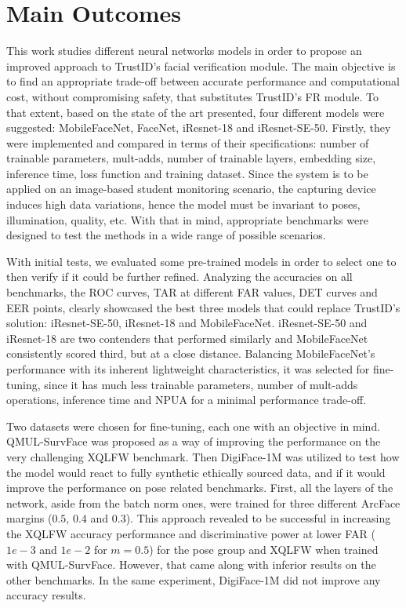 \documentclass[class=report, crop=false, a4paper, 12pt]{standalone}
\begin{document}
\section{Main Outcomes}
\par This work studies different neural networks models in order to propose an improved approach to TrustID's facial verification module. The main objective is to find an appropriate trade-off between accurate performance and computational cost, without compromising safety, that substitutes TrustID's FR module. To that extent, based on the state of the art presented, four different models were suggested: MobileFaceNet, FaceNet, iResnet-18 and iResnet-SE-50. Firstly, they were implemented and compared in terms of their specifications: number of trainable parameters, mult-adds, number of trainable layers, embedding size, inference time, loss function and training dataset. Since the system is to be applied on an image-based student monitoring scenario, the capturing device induces high data variations, hence the model must be invariant to poses, illumination, quality, etc. With that in mind, appropriate benchmarks were designed to test the methods in a wide range of possible scenarios.

\par With initial tests, we evaluated some pre-trained models in order to select one to then verify if it could be further refined. Analyzing the accuracies on all benchmarks, the ROC curves, TAR at different FAR values, DET curves and EER points, clearly showcased the best three models that could replace TrustID's solution: iResnet-SE-50, iResnet-18 and MobileFaceNet. iResnet-SE-50 and iResnet-18 are two contenders that performed similarly and MobileFaceNet consistently scored third, but at a close distance. Balancing MobileFaceNet's performance with its inherent lightweight characteristics, it was selected for fine-tuning, since it has much less trainable parameters, number of mult-adds operations, inference time and NPUA for a minimal performance trade-off.

\par Two datasets were chosen for fine-tuning, each one with an objective in mind. QMUL-SurvFace was proposed as a way of improving the performance on the very challenging XQLFW benchmark. Then DigiFace-1M was utilized to test how the model would react to fully synthetic ethically sourced data, and if it would improve the performance on pose related benchmarks. First, all the layers of the network, aside from the batch norm ones, were trained for three different ArcFace margins ($0.5$, $0.4$ and $0.3$). This approach revealed to be successful in increasing the XQLFW accuracy performance and discriminative power at lower FAR ($1e-3$ and $1e-2$ for $m=0.5$) for the pose group and XQLFW when trained with QMUL-SurvFace. However, that came along with inferior results on the other benchmarks. In the same experiment, DigiFace-1M did not improve any accuracy results.  
\end{document}
